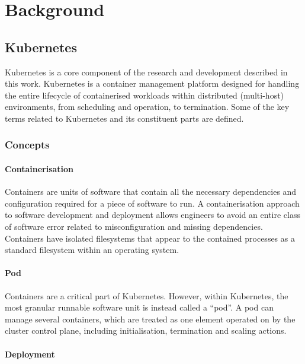 \chapter{Background}



\section{Kubernetes}

Kubernetes is a core component of the research and development described in this work. Kubernetes is a container management platform designed for handling the entire lifecycle of containerised workloads within distributed (multi-host) environments, from scheduling and operation, to termination. Some of the key terms related to Kubernetes and its constituent parts are defined.

\subsection{Concepts}

\subsubsection{Containerisation}

Containers are units of software that contain all the necessary dependencies and configuration required for a piece of software to run. A containerisation approach to software development and deployment allows engineers to avoid an entire class of software error related to misconfiguration and missing dependencies. Containers have isolated filesystems that appear to the contained processes as a standard filesystem within an operating system.

\subsubsection{Pod}

Containers are a critical part of Kubernetes. However, within Kubernetes, the most granular runnable software unit is instead called a “pod”. A pod can manage several containers, which are treated as one element operated on by the cluster control plane, including initialisation, termination and scaling actions.

\subsubsection{Deployment}

